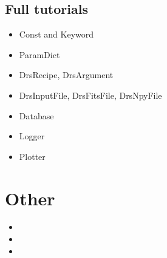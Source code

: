 \documentclass[a4paper,10pt,english]{report}
\begin{document}
\section{Full tutorials}
\label{\detokenize{dev/developer_guide:full-tutorials}}\begin{itemize}
\item {} 
Const and Keyword

\item {} 
ParamDict

\item {} 
DrsRecipe, DrsArgument

\item {} 
DrsInputFile, DrsFitsFile, DrsNpyFile

\item {} 
Database

\item {} 
Logger

\item {} 
Plotter

\end{itemize}


\chapter{Other}
\label{\detokenize{index:other}}\begin{itemize}
\item {} 

\item {} 

\item {} 

\end{itemize}
\end{document}

